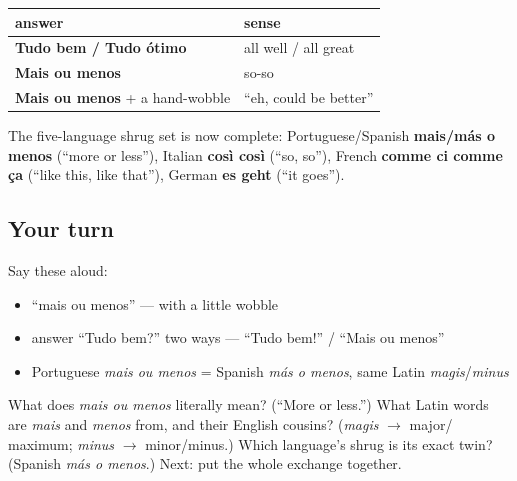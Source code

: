 \begin{grammarlens}[title={Grammar Lens: your answer ladder for \emph{Tudo bem?}}]
\noindent
\begin{tabularx}{\linewidth}{@{}>{\raggedright\arraybackslash}X>{\raggedright\arraybackslash}X@{}}
\toprule
\textbf{answer} & \textbf{sense} \\
\midrule
\textbf{Tudo bem / Tudo ótimo} & all well / all great \\
\textbf{Mais ou menos} & so-so \\
\textbf{Mais ou menos} + a hand-wobble & \textquotedblleft{}eh, could be better\textquotedblright{} \\
\bottomrule
\end{tabularx}

The five-language shrug set is now complete: Portuguese/Spanish \textbf{mais/más o menos} (\textquotedblleft{}more or less\textquotedblright{}), Italian \textbf{così così} (\textquotedblleft{}so, so\textquotedblright{}), French \textbf{comme ci comme ça} (\textquotedblleft{}like this, like that\textquotedblright{}), German \textbf{es geht} (\textquotedblleft{}it goes\textquotedblright{}).
\end{grammarlens}

\subsection*{Your turn}
Say these aloud:

\begin{itemize}
\raggedright
  \item \textquotedblleft{}mais ou menos\textquotedblright{} — with a little wobble
  \item answer \textquotedblleft{}Tudo bem?\textquotedblright{} two ways — \textquotedblleft{}Tudo bem!\textquotedblright{} / \textquotedblleft{}Mais ou menos\textquotedblright{}
  \item Portuguese \emph{mais ou menos} = Spanish \emph{más o menos}, same Latin \emph{magis}/\emph{minus}
\end{itemize}

\begin{tcolorbox}[breakable,colback=teal!4,colframe=teal!35!black,title={Before you move on}]
What does \emph{mais ou menos} literally mean? (\textquotedblleft{}More or less.\textquotedblright{}) What Latin words are \emph{mais} and \emph{menos} from, and their English cousins? (\emph{magis} $\to$ major/ maximum; \emph{minus} $\to$ minor/minus.) Which language's shrug is its exact twin? (Spanish \emph{más o menos}.) Next: put the whole exchange together.
\end{tcolorbox}

